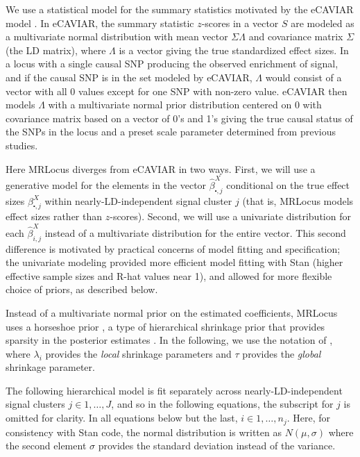 \documentclass[11pt]{article}
\begin{document}
We use a statistical model for the summary statistics motivated by the
eCAVIAR model \citep{eCAVIAR}. In eCAVIAR, the summary statistic
$z$-scores in a vector $S$ are modeled as a multivariate normal
distribution with mean vector $\Sigma \Lambda$ and covariance matrix
$\Sigma$ (the LD matrix), where $\Lambda$ is a vector giving the true
standardized effect sizes. In a locus with a single causal SNP
producing the observed enrichment of signal, and if the causal SNP is
in the set modeled by eCAVIAR, $\Lambda$ would consist of a vector
with all 0 values except for one SNP with non-zero value.  eCAVIAR
then models $\Lambda$ with a multivariate normal prior distribution
centered on 0 with covariance matrix based on a vector of 0's and 1's
giving the true causal status of the SNPs in the locus and a preset
scale parameter determined from previous studies.

Here MRLocus diverges from eCAVIAR in two ways. First, we will use a
generative model for the elements in the vector
$\widehat{\beta}^X_{\centerdot,j}$ conditional on the true effect sizes
$\beta^X_{\centerdot,j}$ within nearly-LD-independent signal cluster
$j$ (that is, MRLocus models effect sizes rather than $z$-scores).
Second, we will use a univariate distribution for each
$\widehat{\beta}^X_{i,j}$ instead of a multivariate distribution for
the entire vector. This second difference is motivated by practical
concerns of model fitting and specification; the univariate modeling
provided more efficient model fitting with Stan (higher effective
sample sizes and R-hat values near 1), and allowed for more
flexible choice of priors, as described below. 

Instead of a multivariate normal prior on the estimated coefficients,
MRLocus uses a horseshoe prior \citep{horseshoe1,horseshoe2}, 
a type of hierarchical shrinkage prior that provides sparsity in the
posterior estimates \citep{hiershrink}. In the following, we use the
notation of \citet{horseshoe1}, where $\lambda_i$ provides the
\emph{local} shrinkage parameters and $\tau$ provides the
\emph{global} shrinkage parameter.

The following hierarchical model is fit separately across
nearly-LD-independent signal clusters $j \in 1,\dots,J$, and so in the
following equations, the subscript for $j$ is omitted for clarity. In
all equations below but the last, $i \in 1,\dots,n_j$. Here, for
consistency with Stan code, the normal distribution is written as
$N(\mu,\sigma)$ where the second element $\sigma$ provides the
standard deviation instead of the variance.
\end{document}
